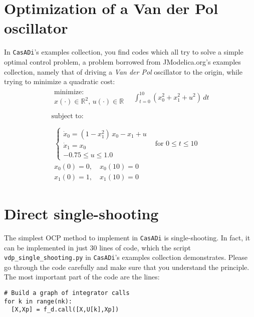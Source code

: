 \documentclass[a4paper,12pt]{book}
\newcommand{\CasADi}{\texttt{CasADi}\xspace}
\begin{document}
\section{Optimization of a Van der Pol oscillator}
In \CasADi's examples collection, you find codes which all try to solve a simple optimal control problem, a problem borrowed from JModelica.org's examples collection, namely that of driving a \emph{Van der Pol} oscillator to the origin, while trying to minimize a quadratic cost:
\begin{equation}
\begin{array}{lc}
\begin{array}{l}
\text{minimize:} \\
x(\cdot) \in \mathbb{R}^2, \, u(\cdot) \in \mathbb{R}
\end{array}
\quad \displaystyle \int_{t=0}^{10}{(x_0^2 + x_1^2 + u^2) \, dt}
\\
\\
\text{subject to:} \\
\\
\begin{array}{ll}
\left\{
\begin{array}{l}
\dot{x}_0 = (1-x_1^2) \, x_0 - x_1 + u \\
\dot{x}_1 = x_0 \\
-0.75 \le u \le 1.0
\end{array} \right. & \text{for $0 \le t \le 10$} \\
x_0(0)=0, \quad x_0(10)=0  \\
x_1(0)=1, \quad x_1(10)=0  
\end{array}
\end{array}
\label{eq:vdp}
\end{equation}

\section{Direct single-shooting}
The simplest OCP method to implement in \CasADi is single-shooting. In fact, it can be implemented in just 30 lines of code, which the script {\texttt{vdp\_single\_shooting.py}} in \CasADi's examples collection demonstrates. Please go through the code carefully and make sure that you understand the principle. The most important part of the code are the lines:
\begin{verbatim}
# Build a graph of integrator calls
for k in range(nk):
  [X,Xp] = f_d.call([X,U[k],Xp])
\end{verbatim}
\end{document}
